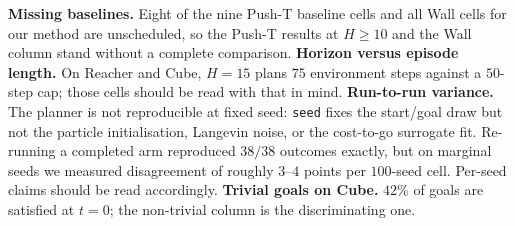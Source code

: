\textbf{Missing baselines.} Eight of the nine Push-T baseline cells and all
Wall cells for our method are unscheduled, so the Push-T results at $H\ge10$ and
the Wall column stand without a complete comparison.
\textbf{Horizon versus episode length.} On Reacher and Cube, $H{=}15$ plans $75$
environment steps against a $50$-step cap; those cells should be read with that
in mind.
\textbf{Run-to-run variance.} The planner is not reproducible at fixed seed:
\texttt{seed} fixes the start/goal draw but not the particle initialisation,
Langevin noise, or the cost-to-go surrogate fit. Re-running a completed arm
reproduced $38/38$ outcomes exactly, but on marginal seeds we measured
disagreement of roughly $3$--$4$ points per $100$-seed cell. Per-seed claims
should be read accordingly.
\textbf{Trivial goals on Cube.} $42\%$ of goals are satisfied at $t{=}0$; the
non-trivial column is the discriminating one.

